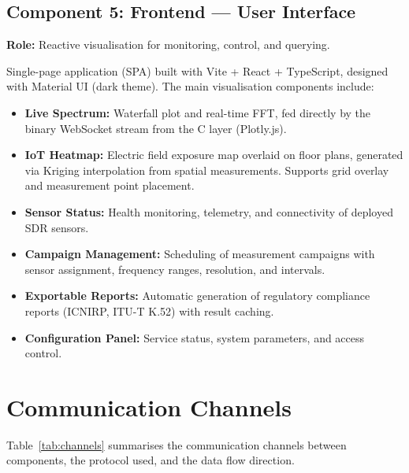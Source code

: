 \documentclass[12pt,a4paper]{article}
\begin{document}
\subsection{Component 5: Frontend --- User Interface}

\textbf{Role:} Reactive visualisation for monitoring, control, and querying.

Single-page application (SPA) built with Vite + React + TypeScript, designed with Material UI (dark theme). The main visualisation components include:

\begin{itemize}
  \item \textbf{Live Spectrum:} Waterfall plot and real-time FFT, fed directly by the binary WebSocket stream from the C layer (Plotly.js).
  \item \textbf{IoT Heatmap:} Electric field exposure map overlaid on floor plans, generated via Kriging interpolation from spatial measurements. Supports grid overlay and measurement point placement.
  \item \textbf{Sensor Status:} Health monitoring, telemetry, and connectivity of deployed SDR sensors.
  \item \textbf{Campaign Management:} Scheduling of measurement campaigns with sensor assignment, frequency ranges, resolution, and intervals.
  \item \textbf{Exportable Reports:} Automatic generation of regulatory compliance reports (ICNIRP, ITU-T K.52) with result caching.
  \item \textbf{Configuration Panel:} Service status, system parameters, and access control.
\end{itemize}

\section{Communication Channels}

Table~\ref{tab:channels} summarises the communication channels between components, the protocol used, and the data flow direction.
\end{document}
